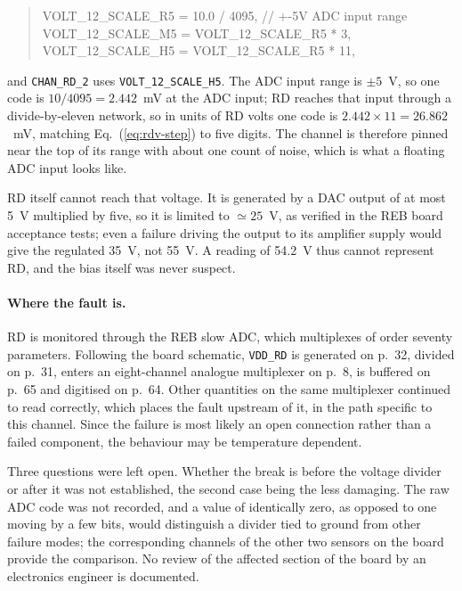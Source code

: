 \begin{quote}\small\ttfamily
VOLT\_12\_SCALE\_R5 = 10.0 / 4095, \quad // +-5V ADC input range \\
VOLT\_12\_SCALE\_M5 = VOLT\_12\_SCALE\_R5 * 3, \\
VOLT\_12\_SCALE\_H5 = VOLT\_12\_SCALE\_R5 * 11,
\end{quote}

\noindent and \texttt{CHAN\_RD\_2} uses \texttt{VOLT\_12\_SCALE\_H5}. The ADC
input range is $\pm5$~V, so one code is $10/4095 = 2.442$~mV at the ADC input;
RD reaches that input through a divide-by-eleven network, so in units of RD
volts one code is $2.442\times11 = 26.862$~mV, matching
Eq.~(\ref{eq:rdv-step}) to five digits. The channel is therefore pinned near
the top of its range with about one count of noise, which is what a floating
ADC input looks like.

RD itself cannot reach that voltage. It is generated by a DAC output of at most
5~V multiplied by five, so it is limited to $\simeq25$~V, as verified in the
REB board acceptance tests; even a failure driving the output to its amplifier
supply would give the regulated 35~V, not 55~V. A reading of 54.2~V thus
cannot represent RD, and the bias itself was never suspect.

\paragraph{Where the fault is.}
\label{sec:r20reb2-where}

RD is monitored through the REB slow ADC, which multiplexes of order seventy
parameters. Following the board schematic, \texttt{VDD\_RD} is generated on
p.~32, divided on p.~31, enters an eight-channel analogue multiplexer on
p.~8, is buffered on p.~65 and digitised on p.~64. Other quantities on the
same multiplexer continued to read correctly, which places the fault upstream
of it, in the path specific to this channel. Since the failure is most likely
an open connection rather than a failed component, the behaviour may be
temperature dependent.

Three questions were left open. Whether the break is before the voltage
divider or after it was not established, the second case being the less
damaging. The raw ADC code was not recorded, and a value of identically zero,
as opposed to one moving by a few bits, would distinguish a divider tied to
ground from other failure modes; the corresponding channels of the other two
sensors on the board provide the comparison. No review of the affected
section of the board by an electronics engineer is documented.

